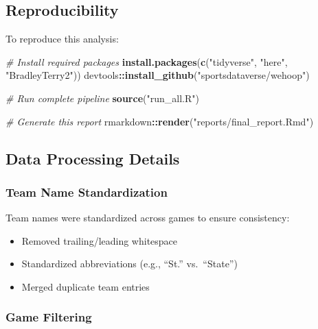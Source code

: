 \documentclass[
]{article}
\newenvironment{Shaded}{\begin{snugshade}}{\end{snugshade}}
\newcommand{\CommentTok}[1]{\textcolor[rgb]{0.56,0.35,0.01}{\textit{#1}}}
\newcommand{\FunctionTok}[1]{\textcolor[rgb]{0.13,0.29,0.53}{\textbf{#1}}}
\newcommand{\NormalTok}[1]{#1}
\newcommand{\SpecialCharTok}[1]{\textcolor[rgb]{0.81,0.36,0.00}{\textbf{#1}}}
\newcommand{\StringTok}[1]{\textcolor[rgb]{0.31,0.60,0.02}{#1}}
\providecommand{\tightlist}{%
  \setlength{\itemsep}{0pt}\setlength{\parskip}{0pt}}
\begin{document}
\subsection{Reproducibility}\label{reproducibility}

To reproduce this analysis:

\begin{Shaded}
\begin{Highlighting}[]
\CommentTok{\# Install required packages}
\FunctionTok{install.packages}\NormalTok{(}\FunctionTok{c}\NormalTok{(}\StringTok{"tidyverse"}\NormalTok{, }\StringTok{"here"}\NormalTok{, }\StringTok{"BradleyTerry2"}\NormalTok{))}
\NormalTok{devtools}\SpecialCharTok{::}\FunctionTok{install\_github}\NormalTok{(}\StringTok{"sportsdataverse/wehoop"}\NormalTok{)}

\CommentTok{\# Run complete pipeline}
\FunctionTok{source}\NormalTok{(}\StringTok{"run\_all.R"}\NormalTok{)}

\CommentTok{\# Generate this report}
\NormalTok{rmarkdown}\SpecialCharTok{::}\FunctionTok{render}\NormalTok{(}\StringTok{"reports/final\_report.Rmd"}\NormalTok{)}
\end{Highlighting}
\end{Shaded}

\subsection{Data Processing Details}\label{data-processing-details}

\subsubsection{Team Name
Standardization}\label{team-name-standardization}

Team names were standardized across games to ensure consistency:

\begin{itemize}
\tightlist
\item
  Removed trailing/leading whitespace
\item
  Standardized abbreviations (e.g., ``St.'' vs.~``State'')
\item
  Merged duplicate team entries
\end{itemize}

\subsubsection{Game Filtering}\label{game-filtering}
\end{document}
